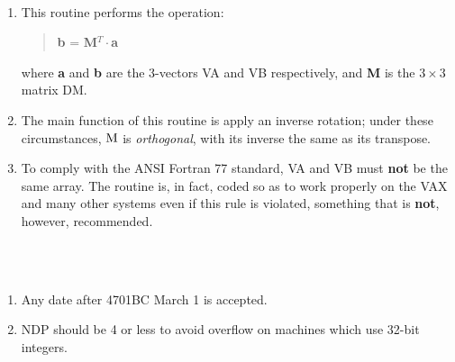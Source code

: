{
}
{
  \\
}
{
}
\notes
{
 \begin{enumerate}
  \item This routine performs the operation:
        \begin{verse}
         {\bf b} = {\bf M}$^{T}\cdot${\bf a}
        \end{verse}
        where {\bf a} and {\bf b} are the 3-vectors VA and VB
        respectively, and  {\bf M} is the $3\times3$ matrix DM.
  \item The main function of this routine is apply an inverse
        rotation;  under these circumstances, ${\bf \rm M}$ is
        {\it orthogonal}, with its inverse the same as its transpose.
  \item To comply with the ANSI Fortran 77 standard, VA and VB must
        {\bf not} be the same array.  The routine is, in fact, coded
        so as to work properly on the VAX and many other systems even
        if this rule is violated, something that is {\bf not}, however,
        recommended.
 \end{enumerate}
}
{
}
{
  \\
}
{
  \\
}
\notes
{
 \begin{enumerate}
  \item Any date after 4701BC March 1 is accepted.
  \item NDP should be 4 or less to avoid overflow on machines which
        use 32-bit integers.
 \end{enumerate}
}
